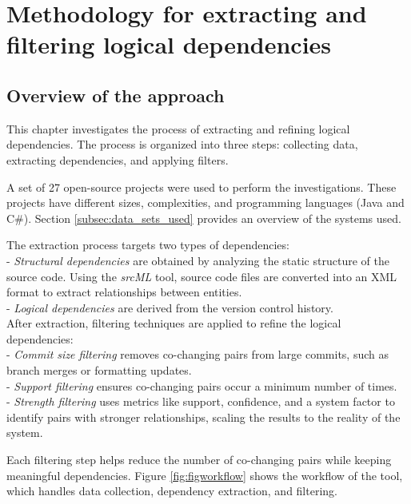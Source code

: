 \chapter{Methodology for extracting and filtering logical dependencies}
\label{extraction}

\section{Overview of the approach}
\label{sec:overview_approach}

\hspace{4em}This chapter investigates the process of extracting and refining logical dependencies. The process is organized into three steps: collecting data, extracting dependencies, and applying filters.

A set of 27 open-source projects were used to perform the investigations. These projects have different sizes, complexities, and programming languages (Java and C\#). Section \ref{subsec:data_sets_used} provides an overview of the systems used.

The extraction process targets two types of dependencies:\\
- \textit{Structural dependencies} are obtained by analyzing the static structure of the source code. Using the \textit{srcML} tool, source code files are converted into an XML format to extract relationships between entities. \\
- \textit{Logical dependencies} are derived from the version control history. \\

After extraction, filtering techniques are applied to refine the logical dependencies:\\
- \textit{Commit size filtering} removes co-changing pairs from large commits, such as branch merges or formatting updates.\\
- \textit{Support filtering} ensures co-changing pairs occur a minimum number of times.\\
- \textit{Strength filtering} uses metrics like support, confidence, and a system factor to identify pairs with stronger relationships, scaling the results to the reality of the system.

Each filtering step helps reduce the number of co-changing pairs while keeping meaningful dependencies. Figure \ref{fig:figworkflow} shows the workflow of the tool, which handles data collection, dependency extraction, and filtering. 



